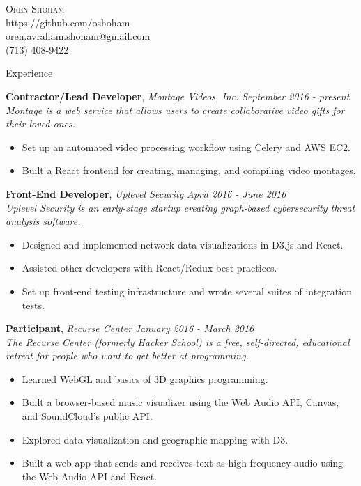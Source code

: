 \documentclass[9pt]{article}
\newenvironment{changemargin}[2]{%
  \begin{list}{}{%
    \setlength{\topsep}{0pt}%
    \setlength{\leftmargin}{#1}%
    \setlength{\rightmargin}{#2}%
    \setlength{\listparindent}{\parindent}%
    \setlength{\itemindent}{\parindent}%
    \setlength{\parsep}{\parskip}%
  }%
  \item[]}{\end{list}
}
\newcommand{\lineover}{
	\begin{changemargin}{-0.05in}{-0.05in}
		\vspace*{-8pt}
		\hrulefill \\
		\vspace*{-2pt}
	\end{changemargin}
}
\newcommand{\header}[1]{
	\begin{changemargin}{-0.5in}{-0.5in}
		\scshape{#1}\\
  	\lineover
	\end{changemargin}
}
\newcommand{\contact}[5]{
	\begin{changemargin}{-0.5in}{-0.5in}
		\begin{center}
			{\Large \scshape {#1}}\\ \smallskip
			{#2}\\ \smallskip 
			{#3}\\ \smallskip
			{#4}\smallskip
		\end{center}
	\end{changemargin}
}
\newenvironment{body} {
	\vspace*{-16pt}
	\begin{changemargin}{-0.25in}{-0.5in}
  }	
	{\end{changemargin}
}
\begin{document}

\contact{Oren Shoham}{https://github.com/oshoham}{oren.avraham.shoham@gmail.com}{(713) 408-9422}



\header{Experience}

\begin{body}
	\vspace{14pt}

	\textbf{Contractor/Lead Developer}, \emph{Montage Videos, Inc.} \hfill  \emph{September 2016 - present}\\
	\emph{Montage is a web service that allows users to create collaborative video gifts for their loved ones.}
	\vspace*{-4pt}
	\begin{itemize} \itemsep -0pt  %
		\item Set up an automated video processing workflow using Celery and AWS EC2.
		\item Built a React frontend for creating, managing, and compiling video montages.
	\end{itemize}

	\textbf{Front-End Developer}, \emph{Uplevel Security} \hfill \emph{April 2016 - June 2016}\\
	\emph{Uplevel Security is an early-stage startup creating graph-based cybersecurity threat analysis software.}
	\vspace*{-4pt}
	\begin{itemize} \itemsep -0pt  %
		\item Designed and implemented network data visualizations in D3.js and React.
		\item Assisted other developers with React/Redux best practices.
		\item Set up front-end testing infrastructure and wrote several suites of integration tests.
	\end{itemize}

	\textbf{Participant}, \emph{Recurse Center} \hfill  \emph{January 2016 - March 2016}\\
	\emph{The Recurse Center (formerly Hacker School) is a free, self-directed, educational retreat for people who want to get better at programming.}
	\vspace*{-4pt}
	\begin{itemize} \itemsep -0pt  %
		\item Learned WebGL and basics of 3D graphics programming.
		\item Built a browser-based music visualizer using the Web Audio API, Canvas, and SoundCloud's public API.
		\item Explored data visualization and geographic mapping with D3.
		\item Built a web app that sends and receives text as high-frequency audio using the Web Audio API and React.
	\end{itemize}


\end{body}
\end{document}
